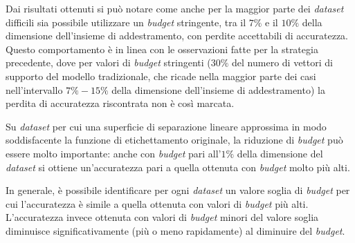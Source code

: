 Dai risultati ottenuti si può notare come anche per la maggior parte dei \emph{dataset} difficili sia possibile utilizzare un \emph{budget} stringente, tra il $7\%$ e il $10\%$ della dimensione dell'insieme di addestramento, con perdite accettabili di accuratezza.
Questo comportamento è in linea con le osservazioni fatte per la strategia precedente, dove per valori di \emph{budget} stringenti ($30\%$ del numero di vettori di supporto del modello tradizionale, che ricade nella maggior parte dei casi nell'intervallo $7\%-15\%$ della dimensione dell'insieme di addestramento) la perdita di accuratezza riscontrata non è così marcata.

Su \emph{dataset} per cui una superficie di separazione lineare approssima in modo soddisfacente la funzione di etichettamento originale, la riduzione di \emph{budget} può essere molto importante: anche con \emph{budget} pari all'$1\%$ della dimensione del \emph{dataset} si ottiene un'accuratezza pari a quella ottenuta con \emph{budget} molto più alti.

In generale, è possibile identificare per ogni \emph{dataset} un valore soglia di \emph{budget} per cui l'accuratezza è simile a quella ottenuta con valori di \emph{budget} più alti. 
L'accuratezza invece ottenuta con valori di \emph{budget} minori del valore soglia diminuisce significativamente (più o meno rapidamente) al diminuire del \emph{budget}.


